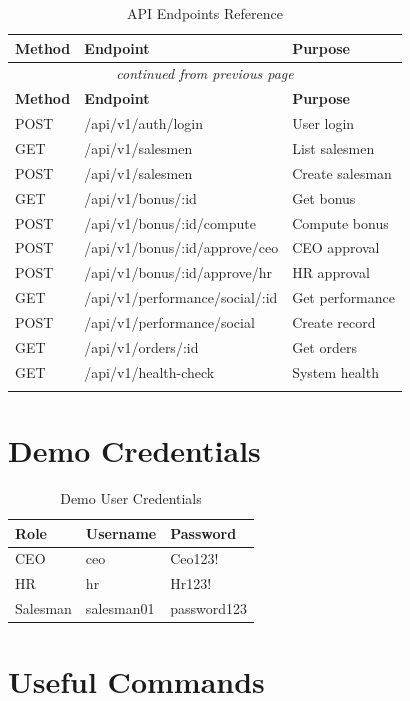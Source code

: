 \documentclass[11pt,a4paper,oneside,openany]{book}
\begin{document}
\begin{longtable}{lll}
\toprule
\textbf{Method} & \textbf{Endpoint} & \textbf{Purpose} \\
\midrule
\endfirsthead
\multicolumn{3}{c}{\textit{continued from previous page}} \\
\toprule
\textbf{Method} & \textbf{Endpoint} & \textbf{Purpose} \\
\midrule
\endhead
\endfoot
\hline
\endlastfoot
POST & /api/v1/auth/login & User login \\
GET & /api/v1/salesmen & List salesmen \\
POST & /api/v1/salesmen & Create salesman \\
GET & /api/v1/bonus/:id & Get bonus \\
POST & /api/v1/bonus/:id/compute & Compute bonus \\
POST & /api/v1/bonus/:id/approve/ceo & CEO approval \\
POST & /api/v1/bonus/:id/approve/hr & HR approval \\
GET & /api/v1/performance/social/:id & Get performance \\
POST & /api/v1/performance/social & Create record \\
GET & /api/v1/orders/:id & Get orders \\
GET & /api/v1/health-check & System health \\
\caption{API Endpoints Reference}
\label{tab:endpoints}
\end{longtable}

\section{Demo Credentials}

\begin{table}[H]
\centering
\begin{tabular}{lll}
\toprule
\textbf{Role} & \textbf{Username} & \textbf{Password} \\
\midrule
CEO & ceo & Ceo123! \\
HR & hr & Hr123! \\
Salesman & salesman01 & password123 \\
\bottomrule
\end{tabular}
\caption{Demo User Credentials}
\end{table}

\section{Useful Commands}
\end{document}
